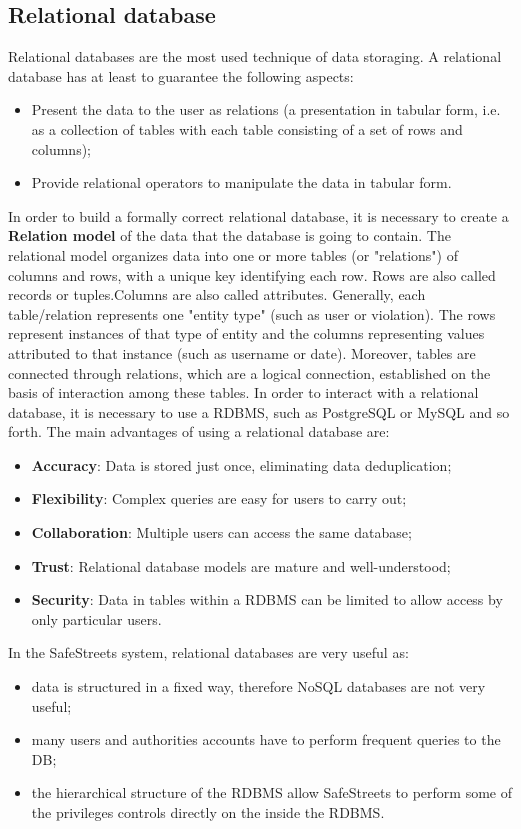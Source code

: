 \subsection{Relational database}
Relational databases are the most used technique of data storaging. A relational database has at least to guarantee the following aspects:
\begin{itemize}
    \item Present the data to the user as relations (a presentation in tabular form, i.e. as a collection of tables with each table consisting of a set of rows and columns);
    \item Provide relational operators to manipulate the data in tabular form.
\end{itemize}
In order to build a formally correct relational database, it is necessary to create a \textbf{Relation model} of the data that the database is going to contain. The relational model organizes data into one or more tables (or "relations") of columns and rows, with a unique key identifying each row. Rows are also called records or tuples.Columns are also called attributes. Generally, each table/relation represents one "entity type" (such as user or violation). The rows represent instances of that type of entity  and the columns representing values attributed to that instance (such as username or date). 
\newline Moreover, tables are connected through relations, which are a logical connection, established on the basis of interaction among these tables. 
\newline In order to interact with a relational database, it is necessary to use a RDBMS, such as PostgreSQL or MySQL and so forth.
\newline The main advantages of using a relational database are:
\begin{itemize}
    \item \textbf{Accuracy}: Data is stored just once, eliminating data deduplication;
    \item \textbf{Flexibility}: Complex queries are easy for users to carry out;
    \item \textbf{Collaboration}: Multiple users can access the same database;
    \item \textbf{Trust}: Relational database models are mature and well-understood;
    \item \textbf{Security}: Data in tables within a RDBMS can be limited to allow access by only particular users.
\end{itemize}
In the SafeStreets system, relational databases are very useful as: 
\begin{itemize}
    \item data is structured in a fixed way, therefore NoSQL databases are not very useful;
    \item many users and authorities accounts have to perform frequent queries to the DB;
    \item the hierarchical structure of the RDBMS allow SafeStreets to perform some of the privileges controls directly on the inside the RDBMS.
\end{itemize}

